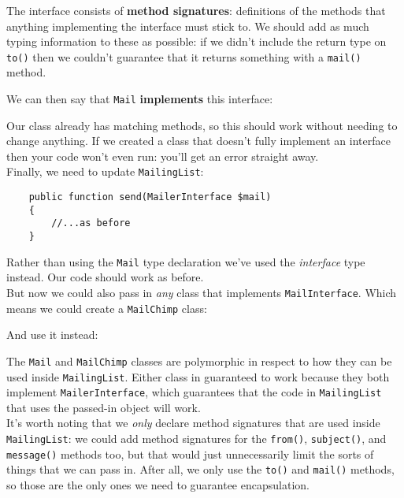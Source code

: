 
The interface consists of \textbf{method signatures}: definitions of the methods that anything implementing the interface must stick to. We should add as much typing information to these as possible: if we didn't include the return type on \texttt{to()} then we couldn't guarantee that it returns something with a \texttt{mail()} method.

We can then say that \texttt{Mail} \textbf{implements} this interface:


Our class already has matching methods, so this should work without needing to change anything. If we created a class that doesn't fully implement an interface then your code won't even run: you'll get an error straight away.
\\

Finally, we need to update \texttt{MailingList}:

\begin{verbatim}
    public function send(MailerInterface $mail)
    {
        //...as before
    }
\end{verbatim}

Rather than using the \texttt{Mail} type declaration we've used the \textit{interface} type instead. Our code should work as before.
\\

But now we could also pass in \textit{any} class that implements \texttt{MailInterface}. Which means we could create a \texttt{MailChimp} class:


And use it instead:


The \texttt{Mail} and \texttt{MailChimp} classes are polymorphic in respect to how they can be used inside \texttt{MailingList}. Either class in guaranteed to work because they both implement \texttt{MailerInterface}, which guarantees that the code in \texttt{MailingList} that uses the passed-in object will work.
\\

It's worth noting that we \textit{only} declare method signatures that are used inside \texttt{MailingList}: we could add method signatures for the \texttt{from()}, \texttt{subject()}, and \texttt{message()} methods too, but that would just unnecessarily limit the sorts of things that we can pass in. After all, we only use the \texttt{to()} and \texttt{mail()} methods, so those are the only ones we need to guarantee encapsulation.
\\

